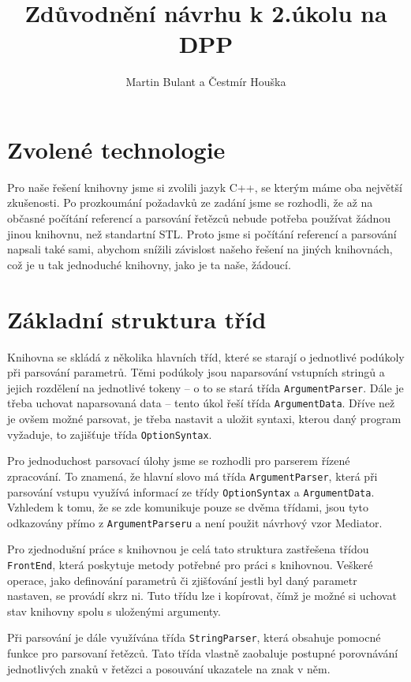 \documentclass[a4paper,10pt]{article}
\title{Zdůvodnění návrhu k 2.úkolu na DPP}
\author{Martin Bulant a Čestmír Houška}
\begin{document}
\maketitle

\section*{Zvolené technologie}

Pro naše řešení knihovny jsme si zvolili jazyk C++, se kterým máme oba největší zkušenosti. Po prozkoumání
požadavků ze zadání jsme se rozhodli, že až na občasné počítání referencí a parsování řetězců nebude potřeba
používat žádnou jinou knihovnu, než standartní STL. Proto jsme si počítání referencí a parsování napsali také
sami, abychom snížili závislost našeho řešení na jiných knihovnách, což je u tak jednoduché knihovny, jako
je ta naše, žádoucí.

\section*{Základní struktura tříd}

Knihovna se skládá z několika hlavních tříd, které se starají o jednotlivé podúkoly při parsování parametrů.
Těmi podúkoly jsou naparsování vstupních stringů a jejich rozdělení na jednotlivé tokeny -- o to se stará třída \verb|ArgumentParser|.
Dále je třeba uchovat naparsovaná data -- tento úkol řeší třída \verb|ArgumentData|.
Dříve než je ovšem možné parsovat, je třeba nastavit a uložit syntaxi, kterou daný program vyžaduje, to zajišťuje třída \verb|OptionSyntax|.

Pro jednoduchost parsovací úlohy jsme se rozhodli pro parserem řízené zpracování. To znamená, že hlavní slovo
má třída \verb|ArgumentParser|, která při parsování vstupu využívá informací ze třídy \verb|OptionSyntax| a \verb|ArgumentData|.
Vzhledem k tomu, že se zde komunikuje pouze se dvěma třídami, jsou tyto odkazovány přímo z \verb|ArgumentParseru|
a není použit návrhový vzor Mediator.

Pro zjednodušní práce s knihovnou je celá tato struktura zastřešena třídou \verb|FrontEnd|, která poskytuje metody
potřebné pro práci s knihovnou. Veškeré operace, jako definování parametrů či zjišťování jestli byl
daný parametr nastaven, se provádí skrz ni. Tuto třídu lze i kopírovat, čímž je možné si uchovat stav knihovny
spolu s uloženými argumenty.

Při parsování je dále využívána třída \verb|StringParser|, která obsahuje pomocné funkce pro parsovaní řetězců. Tato třída
vlastně zaobaluje postupné porovnávání jednotlivých znaků v řetězci a posouvání ukazatele na znak v něm.
\end{document}

